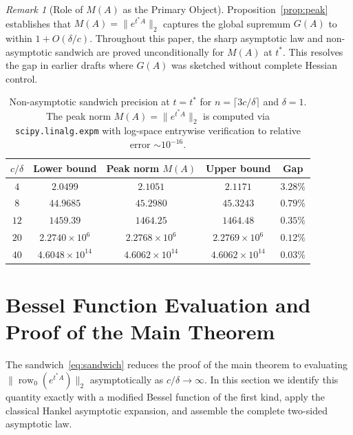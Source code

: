 \documentclass[11pt,reqno]{article}
\theoremstyle{plain}
\theoremstyle{definition}
\theoremstyle{remark}
\newtheorem{remark}[theorem]{Remark}
\numberwithin{equation}{section}
\begin{document}
\begin{remark}[Role of $M(A)$ as the Primary Object]\label{rem:M_vs_G}
Proposition~\ref{prop:peak} establishes that $M(A) = \|e^{t^*A}\|_2$ captures the global supremum $G(A)$ to within $1 + O(\delta/c)$. Throughout this paper, the sharp asymptotic law and non-asymptotic sandwich are proved unconditionally for $M(A)$ at $t^*$. This resolves the gap in earlier drafts where $G(A)$ was sketched without complete Hessian control.
\end{remark}

\begin{table}[ht]
\centering
\caption{Non-asymptotic sandwich precision at $t = t^*$ for $n = \lceil 3c/\delta \rceil$ and $\delta = 1$. The peak norm $M(A) = \|e^{t^*A}\|_2$ is computed via \texttt{scipy.linalg.expm} with log-space entrywise verification to relative error $\sim 10^{-16}$.}
\label{tab:sandwich}
\begin{tabular}{ccccc}
\toprule
$c/\delta$ & Lower bound & Peak norm $M(A)$ & Upper bound & Gap \\
\midrule
$4$  & $2.0499$              & $2.1051$              & $2.1171$              & $3.28\%$ \\
$8$  & $44.9685$             & $45.2980$             & $45.3243$             & $0.79\%$ \\
$12$ & $1459.39$             & $1464.25$             & $1464.48$             & $0.35\%$ \\
$20$ & $2.2740\times10^{6}$  & $2.2768\times10^{6}$  & $2.2769\times10^{6}$  & $0.12\%$ \\
$40$ & $4.6048\times10^{14}$ & $4.6062\times10^{14}$ & $4.6062\times10^{14}$ & $0.03\%$ \\
\bottomrule
\end{tabular}
\end{table}

\section{Bessel Function Evaluation and Proof of the Main Theorem}\label{sec:bessel}

The sandwich~\eqref{eq:sandwich} reduces the proof of the main theorem to evaluating $\|\operatorname{row}_0(e^{t^*A})\|_2$ asymptotically as $c/\delta \to \infty$. In this section we identify this quantity exactly with a modified Bessel function of the first kind, apply the classical Hankel asymptotic expansion, and assemble the complete two-sided asymptotic law.
\end{document}
